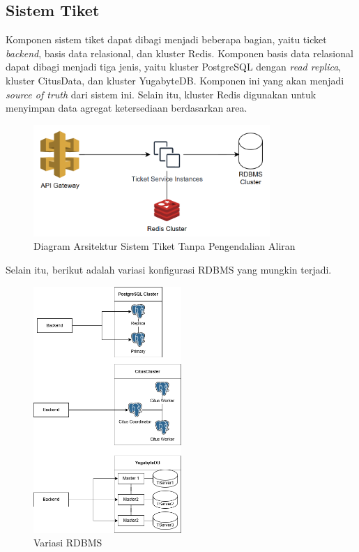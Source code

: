 \subsection{Sistem Tiket}

Komponen sistem tiket dapat dibagi menjadi beberapa bagian, yaitu ticket \textit{backend}, basis data relasional, dan kluster Redis. Komponen basis data relasional dapat dibagi menjadi tiga jenis, yaitu kluster PostgreSQL dengan \textit{read replica}, kluster CitusData, dan kluster YugabyteDB. Komponen ini yang akan menjadi \textit{source of truth} dari sistem ini. Selain itu, kluster Redis digunakan untuk menyimpan data agregat ketersediaan berdasarkan area.

\begin{figure}[htbp]
    \centering
    \includegraphics[width=0.8\textwidth]{resources/chapter-3/ticket-nofc.png}
    \caption{Diagram Arsitektur Sistem Tiket Tanpa Pengendalian Aliran}
    \label{fig:ticket-nofc}
\end{figure}

\pagebreak

Selain itu, berikut adalah variasi konfigurasi RDBMS yang mungkin terjadi.

\begin{figure}[htbp]
    \centering
    \includegraphics[width=0.5\textwidth]{resources/chapter-3/rdbms.png}
    \caption{Variasi RDBMS}
    \label{fig:rdbms-variation}
\end{figure}

